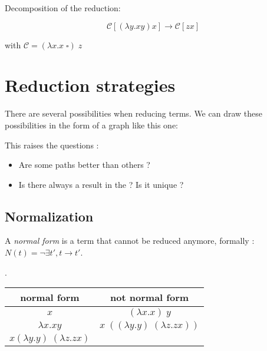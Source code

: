 \documentclass{article}
\theoremstyle{plain}
\theoremstyle{plain}
\begin{document}
  Decomposition of the reduction:

  \[
    \mathcal C[(\lambda y.xy)x] \to \mathcal C [zx]
  \]

  with $\mathcal C = (\lambda x.x\;\square)\;z$



  \newpage
  \section{Reduction strategies}

  There are several possibilities when reducing terms. We can draw these
  possibilities in the form of a graph like this one:

  \begin{center}
  \end{center}

  This raises the questions : \begin{itemize}
    \item Are some paths better than others ?
    \item Is there always a result in the ? Is it unique ?
  \end{itemize}

  \subsection{Normalization}

  A \textit{normal form} is a term that cannot be reduced anymore,
  formally : $N(t) = \neg \exists t', t \to t' $.

  \exam.

  \begin{tabular}{c|c}
    normal form & not normal form \\
    \hline
    $x$ & $(\lambda x.x)\; y$ \\
    $\lambda x.xy$ & $x\; ((\lambda y.y)\;(\lambda z.zx))$ \\
    $x (\lambda y.y)\;(\lambda z.zx)$ &
  \end{tabular}
\end{document}

